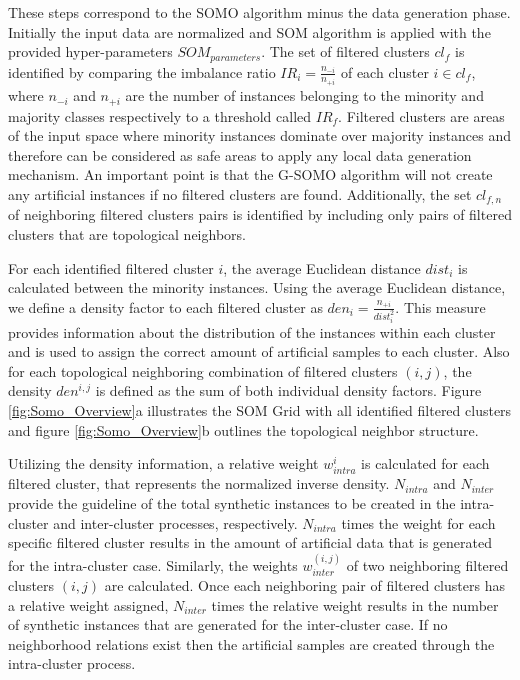 \documentclass[parskip=full]{scrartcl}
\begin{document}
These steps correspond to the SOMO algorithm minus the data generation phase.
Initially the input data are normalized and SOM algorithm is applied with the
provided hyper-parameters $SOM_{parameters}$. The set of filtered clusters $cl_{f}$ is identified by comparing the imbalance ratio $IR_{i} = \frac{n_{-i}}{n_{+i}}$ of each cluster $i \in cl_{f}$, where $n_{-i}$ and $n_{+i}$ are the number of instances belonging to the minority and majority classes respectively to a threshold called $IR_{f}$. Filtered clusters are areas of the input space where minority instances dominate over majority instances and therefore can be considered as safe areas to apply any local data generation mechanism. An important point is that the G-SOMO algorithm will not create any artificial instances if no filtered clusters are found. Additionally, the set $cl_{f, n}$ of neighboring filtered clusters pairs is identified by including only pairs of filtered clusters that are topological neighbors.

For each identified filtered cluster $i$, the average Euclidean distance $dist_{i}$ is calculated between the minority instances. Using the average Euclidean distance, we define a density factor to each filtered cluster as $den_{i} = \frac{n_{+i}}{dist_{i}^2}$. This measure provides information about the distribution of the instances within each cluster and is used to assign the correct amount of artificial samples to each cluster. Also for each topological neighboring combination of filtered clusters $(i, j)$, the density $den^{i, j}$ is defined as the sum of both individual density factors. Figure \ref{fig:Somo_Overview}a illustrates the SOM Grid with all identified filtered clusters and figure \ref{fig:Somo_Overview}b outlines the topological neighbor structure.

Utilizing the density information, a relative weight $w^{i}_{intra}$ is calculated for each filtered cluster, that represents the normalized inverse density. $N_{intra}$ and $N_{inter}$ provide the guideline of the total synthetic instances to be created in the intra-cluster and inter-cluster processes, respectively. $N_{intra}$ times the weight for each specific filtered cluster results in the amount of artificial data that is generated for the intra-cluster case. Similarly, the weights $w^{(i, j)}_{inter}$ of two neighboring filtered clusters $(i, j)$ are calculated. Once each neighboring pair of filtered clusters has a relative weight assigned, $N_{inter}$ times the relative weight results in the number of synthetic instances that are generated for the inter-cluster case. If no neighborhood relations exist then the artificial samples are created through the intra-cluster process.
\end{document}
